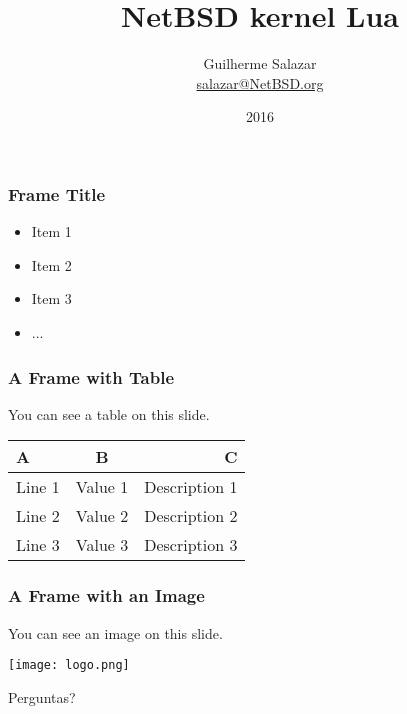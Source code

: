 \documentclass{beamer}
\title{NetBSD kernel Lua}
\author{Guilherme Salazar \\ \url{salazar@NetBSD.org}}
\institute{\texttt{[image: logo.png]}}
\date{2016}
\begin{document}
\frame{\titlepage}

\begin{frame}
\frametitle{Frame Title}

\begin{itemize}
\item Item 1
\item Item 2
\item Item 3
\item ...
\end{itemize}

\end{frame}

\begin{frame}
\frametitle{A Frame with Table}

You can see a table on this slide.

\bigskip

\begin{center}
\begin{tabular}{|lcr|}
\hline
A & B & C \\
\hline
Line 1 & Value 1 & Description 1 \\
Line 2 & Value 2 & Description 2 \\
Line 3 & Value 3 & Description 3 \\
\hline
\end{tabular}
\end{center}

\bigskip
\bigskip

\end{frame}

\begin{frame}
\frametitle{A Frame with an Image}

You can see an image on this slide.

\bigskip

\begin{center}
\texttt{[image: logo.png]}
\end{center}

\bigskip
\bigskip

\end{frame}

\begin{frame}
\begin{center}
{\huge Perguntas?}
\end{center}
\end{frame}
\end{document}
